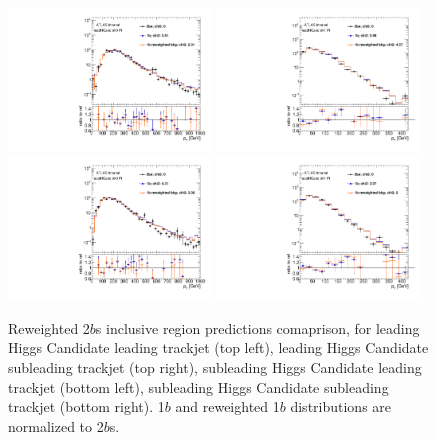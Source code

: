 \begin{figure}[htbp!]
\begin{center}
\includegraphics[width=0.48\textwidth,angle=-90]{figures/boosted/AppendixReweight/Compare/Dijet_Incl_directcompare_leadHCand_trk0_Pt_1.pdf}
\includegraphics[width=0.48\textwidth,angle=-90]{figures/boosted/AppendixReweight/Compare/Dijet_Incl_directcompare_leadHCand_trk1_Pt_1.pdf}\\
\includegraphics[width=0.48\textwidth,angle=-90]{figures/boosted/AppendixReweight/Compare/Dijet_Incl_directcompare_sublHCand_trk0_Pt_1.pdf}
\includegraphics[width=0.48\textwidth,angle=-90]{figures/boosted/AppendixReweight/Compare/Dijet_Incl_directcompare_sublHCand_trk1_Pt_1.pdf}\\
\caption{Reweighted 2$b$s inclusive region predictions comaprison, for leading Higgs Candidate leading trackjet \pt (top left),  leading Higgs Candidate subleading trackjet \pt (top right), subleading Higgs Candidate leading trackjet \pt (bottom left), subleading Higgs Candidate subleading trackjet \pt (bottom right). 1$b$ and reweighted 1$b$ distributions are normalized to 2$b$s.}
\label{fig:app-rw-comp-dijet-2bs-trkjet}
\end{center}
\end{figure}

